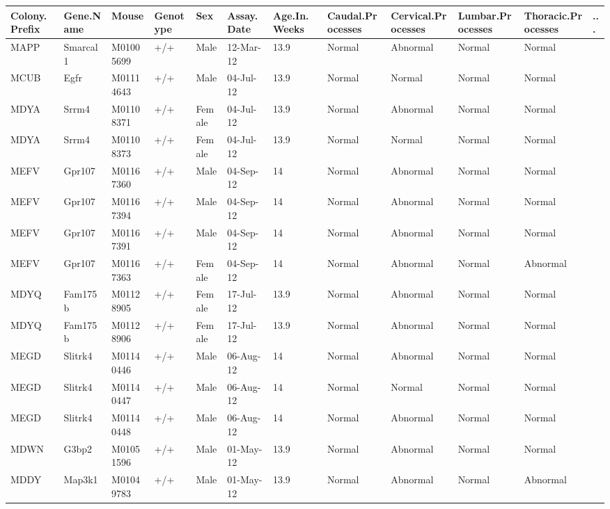 \documentclass[12pt,a4paper]{article}
\begin{document}
\begin{table}
\begin{tabular}{| p{13mm} | p{15mm} | l | l | l | p{19mm}| p{12mm} |  p{16mm}  | p{17mm} | p{16mm} | p{17mm} | l |}
  \hline
Colony.\newline Prefix&Gene.\newline Name&Mouse&\textbf{Genotype}&\textbf{Sex}&\textbf{Assay.\newline Date}&Age.In.\newline Weeks&Caudal.\newline Processes&Cervical.\newline Processes&Lumbar.\newline Processes&Thoracic.\newline Processes& ... \\\hline
MAPP&Smarcal1&M01005699&+/+&Male&12-Mar-12&13.9&Normal&Abnormal&Normal&Normal&\\
MCUB&Egfr&M01114643&+/+&Male&04-Jul-12&13.9&Normal&Normal&Normal&Normal&\\
MDYA&Srrm4&M01108371&+/+&Female&04-Jul-12&13.9&Normal&Abnormal&Normal&Normal&\\
MDYA&Srrm4&M01108373&+/+&Female&04-Jul-12&13.9&Normal&Normal&Normal&Normal&\\
MEFV&Gpr107&M01167360&+/+&Male&04-Sep-12&14&Normal&Abnormal&Normal&Normal&\\
MEFV&Gpr107&M01167394&+/+&Male&04-Sep-12&14&Normal&Abnormal&Normal&Normal&\\
MEFV&Gpr107&M01167391&+/+&Male&04-Sep-12&14&Normal&Abnormal&Normal&Normal&\\
MEFV&Gpr107&M01167363&+/+&Female&04-Sep-12&14&Normal&Abnormal&Normal&Abnormal&\\
MDYQ&Fam175b&M01128905&+/+&Female&17-Jul-12&13.9&Normal&Abnormal&Normal&Normal&\\
MDYQ&Fam175b&M01128906&+/+&Female&17-Jul-12&13.9&Normal&Abnormal&Normal&Normal&\\
MEGD&Slitrk4&M01140446&+/+&Male&06-Aug-12&14&Normal&Abnormal&Normal&Normal&\\
MEGD&Slitrk4&M01140447&+/+&Male&06-Aug-12&14&Normal&Normal&Normal&Normal&\\
MEGD&Slitrk4&M01140448&+/+&Male&06-Aug-12&14&Normal&Abnormal&Normal&Normal&\\
MDWN&G3bp2&M01051596&+/+&Male&01-May-12&13.9&Normal&Abnormal&Normal&Normal&\\
MDDY&Map3k1&M01049783&+/+&Male&01-May-12&13.9&Normal&Abnormal&Normal&Abnormal&\\

\end{tabular}
\end{table}
\end{document}
